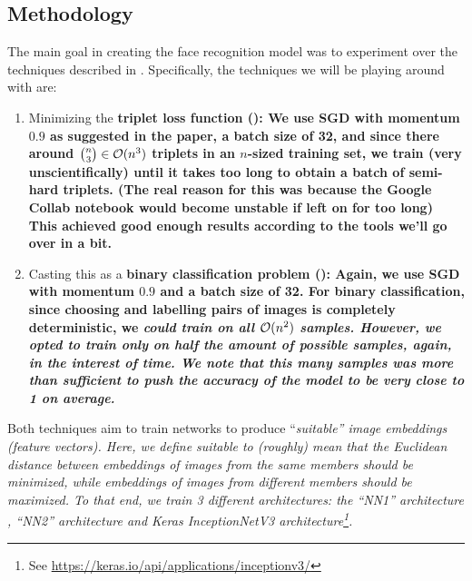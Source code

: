 \subsection{Methodology}

The main goal in creating the face recognition model was to experiment over the techniques described in \cite{deepface,facenet}.
Specifically, the techniques we will be playing around with are:
\begin{enumerate}
    \item Minimizing the \bf{triplet loss function} \cite[Eq. 1]{facenet} (\href{https://github.com/nicholaspun/IZ-Net/blob/master/faceRecognition/TripletPickerHelper.py}{}): We use SGD with momentum $0.9$ as suggested in the paper, a batch size of 32, and since there around $\binom{n}{3} \in \operatorname{\mathcal{O}}(n^3)$ triplets in an $n$-sized training set, we train (very unscientifically) until it takes too long to obtain a batch of semi-hard triplets.
    (The real reason for this was because the Google Collab notebook would become unstable if left on for too long)
    This achieved good enough results according to the tools we'll go over in a bit.

    \item Casting this as a \bf{binary classification} problem \cite[Sec. 4.2]{deepface} (\href{https://github.com/nicholaspun/IZ-Net/blob/master/faceRecognition/PairPickerHelper.py}{}):
    Again, we use SGD with momentum $0.9$ and a batch size of 32.
    For binary classification, since choosing and labelling pairs of images is completely deterministic, we \it{could} train on all $\operatorname{\mathcal{O}}(n^2)$ samples.
    However, we opted to train only on half the amount of possible samples, again, in the interest of time.
    We note that this many samples was more than sufficient to push the accuracy of the model to be very close to 1 on average.
\end{enumerate}

Both techniques aim to train networks to produce ``\it{suitable}'' image embeddings (feature vectors).
Here, we define suitable to (roughly) mean that the Euclidean distance between embeddings of images from the same members should be minimized, while embeddings of images from different members should be maximized.
To that end, we train 3 different architectures: the ``NN1'' architecture \cite[Table 1]{facenet}, ``NN2'' architecture \cite[Table 2]{facenet} and Keras InceptionNetV3 architecture\footnote{See \url{https://keras.io/api/applications/inceptionv3/}}.

